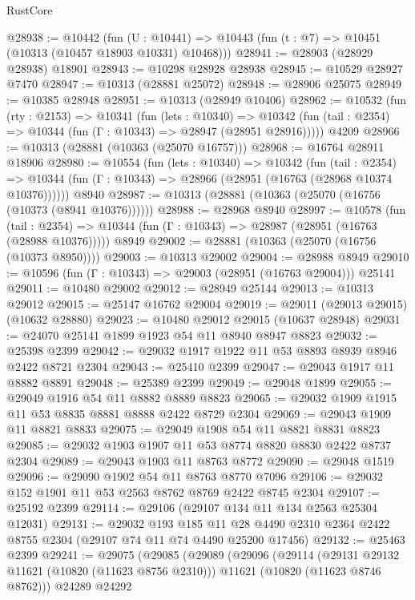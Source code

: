 \begin{lexlean}{RustCore}
\begin{coremodule}
@28938 := @10442
    (fun (U : @10441) => @10443 (fun (t : @7) => @10451 (@10313 (@10457 @18903 @10331) @10468)))
@28941 := @28903 (@28929 @28938) @18901
@28943 := @10298 @28928 @28938
@28945 := @10529 @28927 @7470
@28947 := @10313 (@28881 @25072)
@28948 := @28906 @25075
@28949 := @10385 @28948
@28951 := @10313 (@28949 @10406)
@28962 := @10532
    (fun (rty : @2153) =>
    @10341
      (fun (lets : @10340) =>
      @10342 (fun (tail : @2354) => @10344 (fun (Γ : @10343) => @28947 (@28951 @28916)))))
    @4209
@28966 := @10313 (@28881 (@10363 (@25070 @16757)))
@28968 := @16764 @28911 @18906
@28980 := @10554
    (fun (lets : @10340) =>
    @10342
      (fun (tail : @2354) =>
      @10344 (fun (Γ : @10343) => @28966 (@28951 (@16763 (@28968 @10374 @10376))))))
    @8940
@28987 := @10313 (@28881 (@10363 (@25070 (@16756 (@10373 (@8941 @10376))))))
@28988 := @28968 @8940
@28997 := @10578
    (fun (tail : @2354) => @10344 (fun (Γ : @10343) => @28987 (@28951 (@16763 (@28988 @10376)))))
    @8949
@29002 := @28881 (@10363 (@25070 (@16756 (@10373 @8950))))
@29003 := @10313 @29002
@29004 := @28988 @8949
@29010 := @10596 (fun (Γ : @10343) => @29003 (@28951 (@16763 @29004))) @25141
@29011 := @10480 @29002
@29012 := @28949 @25144
@29013 := @10313 @29012
@29015 := @25147 @16762 @29004
@29019 := @29011 (@29013 @29015) (@10632 @28880)
@29023 := @10480 @29012 @29015 (@10637 @28948)
@29031 := @24070 @25141 @1899 @1923 @54 @11 @8940 @8947 @8823
@29032 := @25398 @2399
@29042 := @29032 @1917 @1922 @11 @53 @8893 @8939 @8946 @2422 @8721 @2304
@29043 := @25410 @2399
@29047 := @29043 @1917 @11 @8882 @8891
@29048 := @25389 @2399
@29049 := @29048 @1899
@29055 := @29049 @1916 @54 @11 @8882 @8889 @8823
@29065 := @29032 @1909 @1915 @11 @53 @8835 @8881 @8888 @2422 @8729 @2304
@29069 := @29043 @1909 @11 @8821 @8833
@29075 := @29049 @1908 @54 @11 @8821 @8831 @8823
@29085 := @29032 @1903 @1907 @11 @53 @8774 @8820 @8830 @2422 @8737 @2304
@29089 := @29043 @1903 @11 @8763 @8772
@29090 := @29048 @1519
@29096 := @29090 @1902 @54 @11 @8763 @8770 @7096
@29106 := @29032 @152 @1901 @11 @53 @2563 @8762 @8769 @2422 @8745 @2304
@29107 := @25192 @2399
@29114 := @29106 (@29107 @134 @11 @134 @2563 @25304 @12031)
@29131 := @29032
    @193
    @185
    @11
    @28
    @4490
    @2310
    @2364
    @2422
    @8755
    @2304
    (@29107 @74 @11 @74 @4490 @25200 @17456)
@29132 := @25463 @2399
@29241 := @29075
    (@29085
      (@29089
        (@29096
          (@29114
            (@29131 @29132 @11621 (@10820 (@11623 @8756 @2310)))
            @11621
            (@10820 (@11623 @8746 @8762)))
          @24289
          @24292

\end{coremodule}
\end{lexlean}
